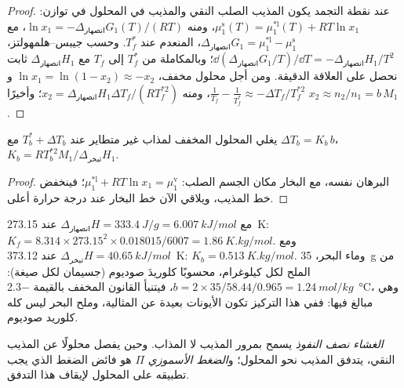 \begin{proof}
عند نقطة التجمد يكون المذيب الصلب النقي والمذيب في المحلول في
توازن: $\mu_1^{\text{s}}(T) = \mu_1^{*\text{l}}(T) + RT\ln x_1$، ومنه
$\ln x_1 = -\Delta_{\text{انصهار}}G_1(T)/(RT)$، مع $\Delta_{\text{انصهار}}G_1 =
\mu_1^{*\text{l}} - \mu_1^{\text{s}}$، المنعدم عند $T_f^*$. وحسب جيبس--هلمهولتز،
$\dd(\Delta_{\text{انصهار}}G_1/T)/\dd T = -\Delta_{\text{انصهار}}H_1/T^2$؛
وبالمكاملة من $T_f^*$ إلى $T_f$ مع $\Delta_{\text{انصهار}}H_1$ ثابت نحصل على
العلاقة الدقيقة. ومن أجل محلول مخفف، $\ln x_1 = \ln(1 - x_2) \approx
-x_2$ و$\frac1{T_f} - \frac1{T_f^*} \approx -\Delta T_f/T_f^{*2}$، ومنه
$x_2 = \Delta_{\text{انصهار}}H_1\Delta T_f/(RT_f^{*2})$؛ وأخيرًا $x_2 \approx
n_2/n_1 = b\,M_1$.
\end{proof}

\begin{proposition}\label{prop:b2:chemical-potential:ebullioscopy}
يغلي المحلول المخفف لمذاب غير متطاير عند $T_b^* + \Delta T_b$ مع
$\Delta T_b = K_b\,b$، $K_b = RT_b^{*2}M_1/\Delta_{\text{تبخر}}H_1$.
\end{proposition}

\begin{proof}
البرهان نفسه، مع البخار مكان الجسم الصلب: $\mu_1^{*\text{l}} +
RT\ln x_1 = \mu_1^{\text{v}}$؛ فينخفض خط المذيب، ويلاقي الآن خط
البخار عند درجة حرارة أعلى.
\end{proof}

\begin{example}[الماء]\label{ex:b2:chemical-potential:water-constants}
مع $\Delta_{\text{انصهار}}H = \qty{333.4}{J/g} = \qty{6.007}{kJ/mol}$ عند
\qty{273.15}{K}: $K_f = 8.314 \times 273.15^2 \times 0.018015/6007 =
\qty{1.86}{K.kg/mol}$. ومع $\Delta_{\text{تبخر}}H = \qty{40.65}{kJ/mol}$ عند
\qty{373.12}{K}: $K_b = \qty{0.513}{K.kg/mol}$. وماء البحر، \qty{35}{g} من الملح
لكل كيلوغرام، محسوبًا كلوريدَ صوديوم (جسيمان لكل صيغة):
$b = 2 \times 35/58.44/0.965 = \qty{1.24}{mol/kg}$، فيتنبأ القانون المخفف
بالقيمة \qty{-2.3}{\celsius}، وهي مبالغ فيها: ففي هذا التركيز تكون
الأيونات بعيدة عن المثالية، وملح البحر ليس كله كلوريد صوديوم.
\end{example}

\begin{definition}\label{def:b2:chemical-potential:osmotic-pressure}
\emph{الغشاء نصف النفوذ} يسمح بمرور
المذيب لا المذاب. وحين يفصل محلولًا عن المذيب النقي، يتدفق المذيب نحو
المحلول؛ و\emph{الضغط الأسموزي} $\Pi$ هو فائض الضغط الذي يجب
تطبيقه على المحلول لإيقاف هذا التدفق.
\end{definition}

